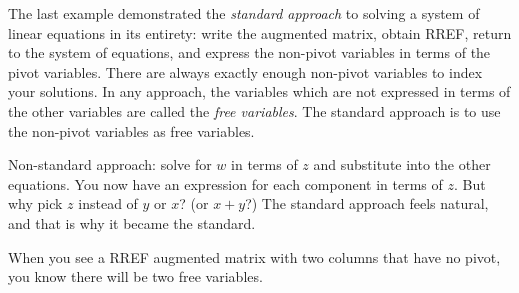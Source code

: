The last example demonstrated the \hypertarget{standard approach}{{\it standard approach}} to solving a system of linear equations in its entirety: write the augmented matrix, obtain RREF, return to the system of equations, and express the non-pivot variables in terms of the pivot variables. 
There are always exactly enough non-pivot variables to index your solutions. 
In any approach, the variables which are not expressed in terms of the other variables are called the {\it free variables}. The standard approach is to use the non-pivot variables as free variables.

Non-standard approach: solve for $w$ in terms of $z$ and substitute into the other equations. You now have an expression for each component in terms of $z$. But why pick $z$ instead of $y$ or $x$? (or $x+y$?) The standard approach feels natural, and that is why it became the standard.

When you see a RREF augmented matrix with two columns that have no pivot, you know there will be two free variables. 

